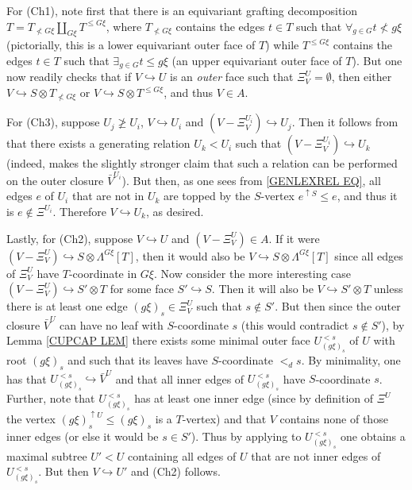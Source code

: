 \documentclass[a4paper,10pt
,draft
]{article}%
\begin{document}
\begin{example}
For (Ch1), note first that there is an equivariant grafting decomposition
$T = T_{\not < G\xi} \amalg_{G \xi} T^{\leq G\xi}$, 
where $T_{\not < G\xi}$ contains the edges $t \in T$ such that
$\forall_{g \in G} t \not < g\xi$ (pictorially, this is a lower equivariant outer face of $T$) 
while $T^{\leq G\xi}$
contains the edges $t \in T$ such that
$\exists_{g \in G} t \leq g\xi$ (an upper equivariant outer face of $T$).
But one now readily checks that if
$V \hookrightarrow U$ is an \textit{outer} face such that
$\Xi^U_V = \emptyset$, then either 
$V \hookrightarrow S \otimes T_{\not < G\xi}$ or 
$V \hookrightarrow S \otimes T^{\leq G\xi}$, and thus $V \in A$.

For (Ch3), suppose $U_j \not \geq U_i$, 
$V \hookrightarrow U_i$ and
$(V - \Xi^{U_i}_V) \hookrightarrow U_j$.
Then it follows from \cite[Lemma 7.37]{Per18}
that there exists a generating relation $U_k < U_i$
such that $(V - \Xi^{U_i}_V) \hookrightarrow U_k$
(indeed, \cite[Lemma 7.37]{Per18} makes the slightly stronger claim that such a relation can be performed on the outer closure $\bar{V}^{U_i}$). But then, as one sees from \eqref{GENLEXREL EQ},
all edges $e$ of $U_i$ that are not in $U_k$ are topped by the $S$-vertex $e^{\uparrow S}\leq e$, and thus it is $e \not \in \Xi^{U_i}$. Therefore $V \hookrightarrow U_k$, as desired.

Lastly, for (Ch2), suppose $V \hookrightarrow U$ and 
$(V - \Xi^{U}_V) \in A$.
If it were 
$(V-\Xi^{U}_V) \hookrightarrow S \otimes \Lambda^{G \xi}[T]$, then it would also be 
$V \hookrightarrow S \otimes \Lambda^{G \xi}[T]$
since all edges of $\Xi^{U}_V$ have 
$T$-coordinate in $G\xi$.
Now consider the more interesting case
$(V - \Xi^{U}_V) \hookrightarrow S' \otimes T$
for some face $S' \hookrightarrow S$.
Then it will also be 
$V \hookrightarrow S' \otimes T$
unless there is at least one edge
$(g \xi)_s \in \Xi^{U}_V$ such that $s \not \in S'$.
But then since the outer closure $\bar{V}^U$ can have no leaf with $S$-coordinate $s$ (this would contradict $s \not \in S'$), 
by Lemma \ref{CUPCAP LEM} there exists some minimal outer face $U_{(g\xi)_s}^{<s}$ of $U$ with root $(g\xi)_s$ and such that its leaves have $S$-coordinate $<_d s$.
By minimality, one has that $U_{(g\xi)_s}^{<s} \hookrightarrow \bar{V}^U$ and that all inner edges of $U_{(g\xi)_s}^{<s}$ have
$S$-coordinate $s$.
Further, note that $U_{(g\xi)_s}^{<s}$
has at least one inner edge
(since by definition of $\Xi^U$ the vertex 
$(g \xi)_s^{\uparrow U} \leq (g \xi)_s$ is a $T$-vertex)
and that $V$ contains none of those inner edges (or else it would be $s \in S'$).
Thus by applying \cite[Lemma 7.34]{Per18}
to $U_{(g\xi)_s}^{<s}$ one obtains a maximal subtree $U' < U$
containing all edges of $U$ that are not inner edges of $U_{(g\xi)_s}^{<s}$.
But then $V \hookrightarrow U'$ and (Ch2) follows.
\end{example}
\end{document}
